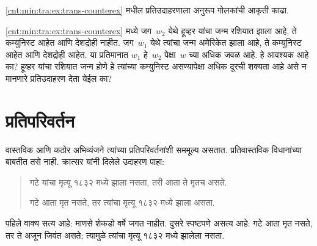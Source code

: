 \begin{prob}
  \ref{cnt:min:tra:ex:trans-counterex}
  मधील प्रतिउदाहरणाला
  अनुरूप गोलकांची
  आकृती काढा.
\end{prob}

\begin{prob}
  \ref{cnt:min:tra:ex:trans-counterex}
  मध्ये जग~$w_2$
  येथे हूव्हर यांचा
  जन्म रशियात झाला
  आहे, ते कम्युनिस्ट
  आहेत आणि देशद्रोही
  नाहीत. जग~$w_1$
  येथे त्यांचा जन्म
  अमेरिकेत झाला
  आहे, ते कम्युनिस्ट
  आहेत आणि देशद्रोही
  आहेत. या प्रतिमानात
  $w_1$ हे~$w_2$
  पेक्षा~$w$ च्या
  अधिक जवळ आहे.
  हे आवश्यक आहे
  का? हूव्हर यांचा
  रशियात जन्म होणे
  हे त्यांच्या
  कम्युनिस्ट असण्यापेक्षा
  अधिक दूरची
  शक्यता आहे असे
  न मानणारे
  प्रतिउदाहरण
  देता येईल का?
\end{prob}












\section{प्रतिपरिवर्तन}\label{cnt:min:cpo:sec}

वास्तविक आणि कठोर
अभिव्यंजने त्यांच्या
प्रतिपरिवर्तनांशी सममूल्य
असतात. प्रतिवास्तविक
विधानांच्या बाबतीत
तसे नाही. क्रात्सर
यांनी दिलेले उदाहरण
पाहा:
\begin{quote}
  गटे यांचा मृत्यू १८३२ मध्ये
  झाला नसता, तरी आता
  ते मृतच असते.

  गटे आता मृत नसते,
  तर त्यांचा मृत्यू
  १८३२ मध्ये झाला असता.
\end{quote}
पहिले वाक्य सत्य आहे:
माणसे शेकडो वर्षे
जगत नाहीत. दुसरे
स्पष्टपणे असत्य आहे:
गटे आता मृत नसते,
तर ते अजून जिवंत
असते; त्यामुळे
त्यांचा मृत्यू
१८३२ मध्ये
झालेला नसता.

